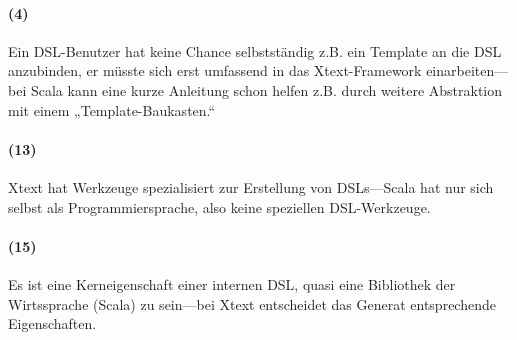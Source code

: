 \paragraph{(4)} Ein DSL-Benutzer hat keine Chance selbstständig
z.B. ein Template an die DSL anzubinden, er müsste sich erst umfassend
in das Xtext-Framework einarbeiten---bei Scala kann eine kurze Anleitung
schon helfen z.B. durch weitere Abstraktion mit einem „Template-Baukasten.“

\paragraph{(13)} Xtext hat Werkzeuge spezialisiert zur Erstellung von
DSLs---Scala hat nur sich selbst als Programmiersprache, also keine speziellen
DSL-Werkzeuge.

\paragraph{(15)} Es ist eine Kerneigenschaft einer internen DSL, quasi
eine Bibliothek der Wirtssprache (Scala) zu sein---bei Xtext entscheidet
das Generat entsprechende Eigenschaften.
